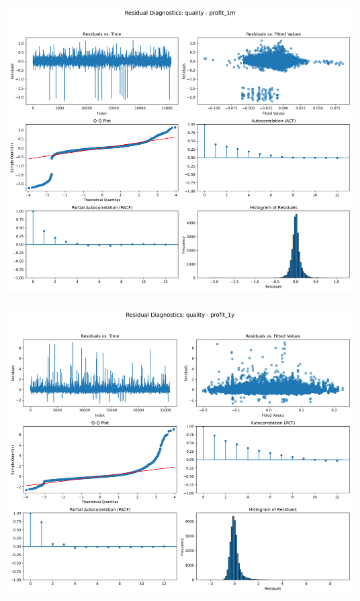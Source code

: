 \documentclass[11pt,english,a4paper,hidelinks]{book}
\begin{document}
\begin{figure}[H]
    \centering
    \begin{subfigure}[b]{0.32\textwidth}
        \centering
        \includegraphics[width=\textwidth]{images/code/models/linear_regression/first_model/AS/quality_profit_1m_residuals.png}
    \end{subfigure}
    \hfill
    \begin{subfigure}[b]{0.32\textwidth}
        \centering
        \includegraphics[width=\textwidth]{images/code/models/linear_regression/first_model/AS/quality_profit_1y_residuals.png}

\end{subfigure}
\end{figure}
\end{document}
